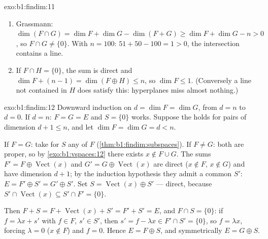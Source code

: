 \begin{solution}{exo:b1:findim:11}
\begin{enumerate}
  \item Grassmann: $\dim(F \cap G) = \dim F + \dim G - \dim(F +
        G) \geq \dim F + \dim G - n > 0$, so $F \cap G \neq
        \{0\}$. With $n = 100$: $51 + 50 - 100 = 1 > 0$, the
        intersection contains a line.
  \item If $F \cap H = \{0\}$, the sum is direct and $\dim F +
        (n - 1) = \dim(F \oplus H) \leq n$, so $\dim F \leq 1$.
        (Conversely a line not contained in $H$ does satisfy
        this: hyperplanes miss almost nothing.)
\end{enumerate}
\end{solution}

\begin{solution}{exo:b1:findim:12}
Downward induction on $d = \dim F = \dim G$, from $d = n$ to $d =
0$. If $d = n$: $F = G = E$ and $S = \{0\}$ works. Suppose the
 holds for  pairs of dimension $d + 1 \leq n$,
and let $\dim F = \dim G = d < n$.

If $F = G$: take for $S$ any  of $F$
(\cref{thm:b1:findim:subspaces}). If $F \neq G$: both are proper,
so by \cref{exo:b1:vspaces:12} there exists $x \notin F \cup G$.
The sums $F' = F \oplus \operatorname{Vect}(x)$ and $G' = G \oplus
\operatorname{Vect}(x)$ are direct ($x \notin F$, $x \notin G$)
and have dimension $d + 1$; by the induction hypothesis they
admit a common  $S'$: $E = F' \oplus S' = G' \oplus
S'$. Set $S = \operatorname{Vect}(x) \oplus S'$ --- direct,
because $S' \cap \operatorname{Vect}(x) \subseteq S' \cap F' =
\{0\}$.

Then $F + S = F + \operatorname{Vect}(x) + S' = F' + S' = E$, and
$F \cap S = \{0\}$: if $f = \lambda x + s'$ with $f \in F$, $s'
\in S'$, then $s' = f - \lambda x \in F' \cap S' = \{0\}$, so $f
= \lambda x$, forcing $\lambda = 0$ ($x \notin F$) and $f = 0$.
Hence $E = F \oplus S$, and symmetrically $E = G \oplus S$.
\end{solution}

